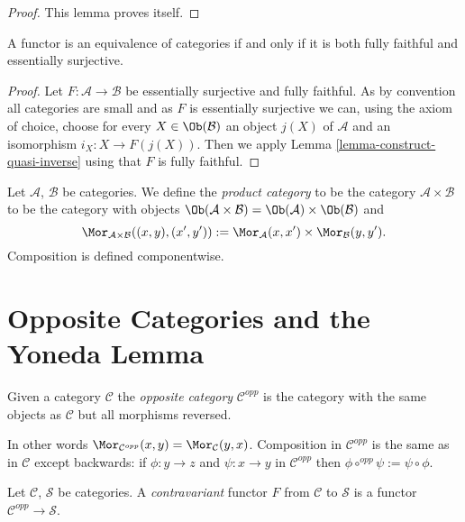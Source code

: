 \begin{proof}
This lemma proves itself.
\end{proof}

\begin{lemma}
\label{lemma-equivalence-categories}
A functor is an equivalence of categories if and only if it is both fully
faithful and essentially surjective.
\end{lemma}

\begin{proof}
Let $F : \mathcal{A} \to \mathcal{B}$ be essentially surjective and fully
faithful. As by convention all categories are small and as $F$ is essentially
surjective we can, using the axiom of choice, choose for every
$X \in \Ob(\mathcal{B})$ an object $j(X)$ of $\mathcal{A}$ and an
isomorphism $i_X : X \to F(j(X))$. Then we apply
Lemma \ref{lemma-construct-quasi-inverse}
using that $F$ is fully faithful.
\end{proof}

\begin{definition}
\label{definition-product-category}
Let $\mathcal{A}$, $\mathcal{B}$ be categories.
We define the {\it product category} to be the category
$\mathcal{A} \times \mathcal{B}$ to be the category with
objects
$\Ob(\mathcal{A} \times \mathcal{B}) =
\Ob(\mathcal{A}) \times \Ob(\mathcal{B})$
and
$$
\Mor_{\mathcal{A} \times \mathcal{B}}((x, y), (x', y'))
:=
\Mor_\mathcal{A}(x, x')\times
\Mor_\mathcal{B}(y, y').
$$
Composition is defined componentwise.
\end{definition}


\section{Opposite Categories and the Yoneda Lemma}
\label{section-opposite}

\begin{definition}
\label{definition-opposite}
Given a category $\mathcal{C}$ the {\it opposite category}
$\mathcal{C}^{opp}$ is the category with the same objects
as $\mathcal{C}$ but all morphisms reversed.
\end{definition}

\noindent
In other
words $\Mor_{\mathcal{C}^{opp}}(x, y) =
\Mor_\mathcal{C}(y, x)$. Composition in $\mathcal{C}^{opp}$
is the same as in $\mathcal{C}$ except backwards: if $\phi : y \to z$ and
$\psi : x \to y$ in $\mathcal{C}^{opp}$ then
$\phi \circ^{opp} \psi := \psi \circ \phi$.

\begin{definition}
\label{definition-contravariant}
Let $\mathcal{C}$, $\mathcal{S}$ be categories.
A {\it contravariant} functor $F$
from $\mathcal{C}$ to $\mathcal{S}$
is a functor $\mathcal{C}^{opp}\to \mathcal{S}$.
\end{definition}

